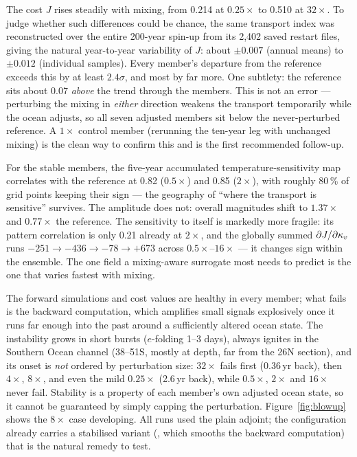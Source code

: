 The cost $J$ rises steadily with mixing, from 0.214 at $0.25\times$ to 0.510
at $32\times$. To judge whether such differences could be chance, the same
transport index was reconstructed over the entire 200-year spin-up from its
2{,}402 saved restart files, giving the natural year-to-year variability of
$J$: about $\pm0.007$ (annual means) to $\pm0.012$ (individual samples).
Every member's departure from the reference exceeds this by at least
$2.4\sigma$, and most by far more. One subtlety: the reference sits about
$0.07$ \emph{above} the trend through the members. This is not an error ---
perturbing the mixing in \emph{either} direction weakens the transport
temporarily while the ocean adjusts, so all seven adjusted members sit below
the never-perturbed reference. A $1\times$ control member (rerunning the
ten-year leg with unchanged mixing) is the clean way to confirm this and is
the first recommended follow-up.

For the stable members, the five-year accumulated temperature-sensitivity
map correlates with the reference at 0.82 ($0.5\times$) and 0.85 ($2\times$),
with roughly 80\,\% of grid points keeping their sign --- the geography of
``where the transport is sensitive'' survives. The amplitude does not: overall
magnitudes shift to $1.37\times$ and $0.77\times$ the reference. The
sensitivity to \kv{} itself is markedly more fragile: its pattern correlation
is only 0.21 already at $2\times$, and the globally summed
$\partial J/\partial\kappa_{v}$ runs $-251 \to -436 \to -78 \to +673$ across
$0.5\times$--$16\times$ --- it changes sign within the ensemble. The one
field a mixing-aware surrogate most needs to predict is the one that varies
fastest with mixing.

The forward simulations and cost values are healthy in every member; what
fails is the backward computation, which amplifies small signals
explosively once it runs far enough into the past around a sufficiently
altered ocean state. The instability grows in short bursts
($e$-folding 1--3 days), always ignites in the Southern Ocean channel
(38--51\dg S, mostly at depth, far from the 26\dg N section), and its onset is
\emph{not} ordered by perturbation size: $32\times$ fails first
(0.36\,yr back), then $4\times$, $8\times$, and even the mild $0.25\times$
(2.6\,yr back), while $0.5\times$, $2\times$ and $16\times$ never fail.
Stability is a property of each member's own adjusted ocean state, so it
cannot be guaranteed by simply capping the perturbation. Figure~\ref{fig:blowup}
shows the $8\times$ case developing. All runs used the plain adjoint; the
configuration already carries a stabilised variant (,
which smooths the backward computation) that is the natural remedy to test.

